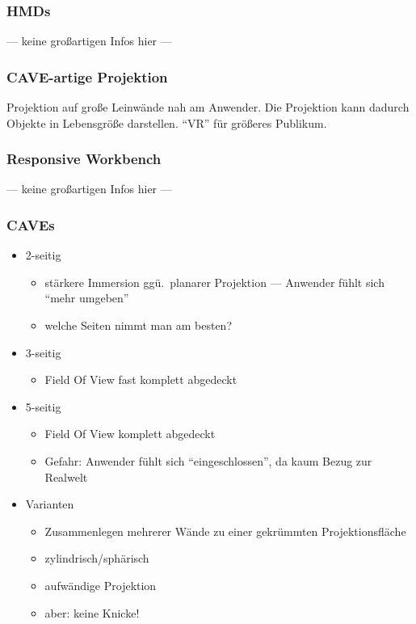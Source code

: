 \documentclass[a4paper, 12pt]{article}
\begin{document}
\subsubsection*{HMDs}
--- keine großartigen Infos hier ---

\subsubsection*{CAVE-artige Projektion}
Projektion auf große Leinwände nah am Anwender. Die Projektion kann dadurch Objekte in Lebensgröße darstellen. ``VR'' für größeres Publikum.

\subsubsection*{Responsive Workbench}
--- keine großartigen Infos hier ---

\subsubsection*{CAVEs}
\begin{itemize}
  \item 2-seitig
    \begin{itemize}
      \item stärkere Immersion ggü.\ planarer Projektion --- Anwender fühlt sich ``mehr umgeben''
      \item welche Seiten nimmt man am besten?
    \end{itemize}
  \item 3-seitig
    \begin{itemize}
      \item Field Of View fast komplett abgedeckt
    \end{itemize}
  \item 5-seitig
    \begin{itemize}
      \item Field Of View komplett abgedeckt
      \item Gefahr: Anwender fühlt sich ``eingeschlossen'', da kaum Bezug zur Realwelt
    \end{itemize}
  \item Varianten
    \begin{itemize}
      \item Zusammenlegen mehrerer Wände zu einer gekrümmten Projektionsfläche
      \item zylindrisch/sphärisch
      \item aufwändige Projektion
      \item aber: keine Knicke!
    \end{itemize}
\end{itemize}
\end{document}
